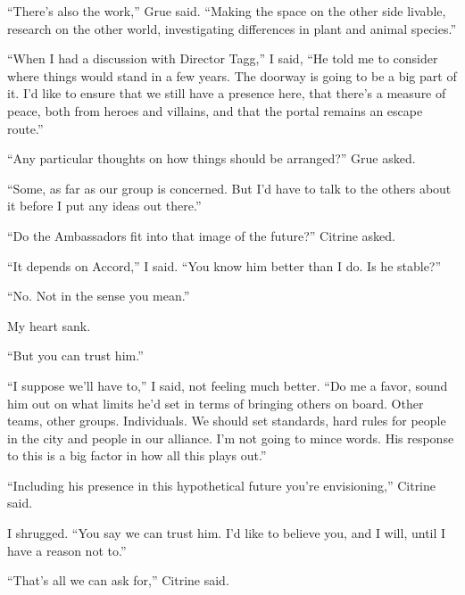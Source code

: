 ``There's also the work,'' Grue said.  ``Making the space on the other side livable, research on the other world, investigating differences in plant and animal species.''



``When I had a discussion with Director Tagg,'' I said, ``He told me to consider where things would stand in a few years.  The doorway is going to be a big part of it.  I'd like to ensure that we still have a presence here, that there's a measure of peace, both from heroes and villains, and that the portal remains an escape route.''



``Any particular thoughts on how things should be arranged?'' Grue asked.



``Some, as far as our group is concerned.  But I'd have to talk to the others about it before I put any ideas out there.''



``Do the Ambassadors fit into that image of the future?'' Citrine asked.



``It depends on Accord,'' I said.  ``You know him better than I do.  Is he stable?''



``No.  Not in the sense you mean.''



My heart sank.



``But you can trust him.''



``I suppose we'll have to,'' I said, not feeling much better.  ``Do me a favor, sound him out on what limits he'd set in terms of bringing others on board.  Other teams, other groups.  Individuals.  We should set standards, hard rules for people in the city and people in our alliance.  I'm not going to mince words.  His response to this is a big factor in how all this plays out.''



``Including his presence in this hypothetical future you're envisioning,'' Citrine said.



I shrugged.  ``You say we can trust him.  I'd like to believe you, and I will, until I have a reason not to.''



``That's all we can ask for,'' Citrine said.



